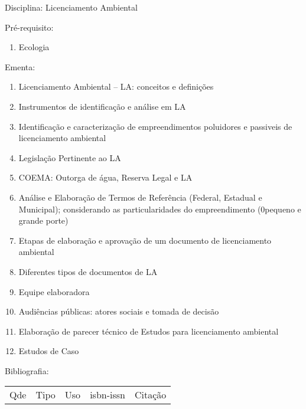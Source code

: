 \documentclass[12pt,a4paper,twoside]{report}
\begin{document}
Disciplina: Licenciamento Ambiental

Pré-requisito:
\begin{enumerate}
\item Ecologia
\end{enumerate}

Ementa:
\begin{enumerate}
\item Licenciamento Ambiental – LA: conceitos e definições
\item Instrumentos de identificação e análise em LA
\item Identificação e caracterização de empreendimentos poluidores e passiveis de licenciamento ambiental
\item Legislação Pertinente ao LA
\item COEMA: Outorga de água, Reserva Legal e LA
\item Análise e Elaboração de Termos de Referência (Federal, Estadual e Municipal); considerando as particularidades do empreendimento (0pequeno e grande porte)
\item Etapas de elaboração e aprovação de um documento de licenciamento ambiental
\item Diferentes tipos de documentos de LA
\item Equipe elaboradora
\item Audiências públicas: atores sociais e tomada de decisão
\item Elaboração de parecer técnico de Estudos para licenciamento ambiental
\item Estudos de Caso
\end{enumerate}

Bibliografia:
\begin{tabular}{lllll}
Qde & Tipo & Uso & isbn-issn & Citação \\
\end{tabular}
\end{document}
